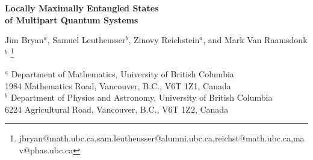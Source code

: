 \documentclass[12pt]{article}
\theoremstyle{definition}
\begin{document}
\tableofcontents
\begin{titlepage}
\hfill
\vbox{
    \halign{#\hfil         \cr
           } %
      }  %
\vspace*{20mm}
\begin{center}
{\Large \bf Locally Maximally Entangled States \\ of Multipart Quantum Systems}

\vspace*{15mm}
\vspace*{1mm}
Jim Bryan$^a$, Samuel Leutheusser$^b$, Zinovy Reichstein$^a$, and Mark Van Raamsdonk$^b$
\vspace*{1cm}
\let\thefootnote\relax\footnote{jbryan@math.ubc.ca,sam.leutheusser@alumni.ubc.ca,reichst@math.ubc.ca,mav@phas.ubc.ca}

{${}^{a}$ Department of Mathematics,
University of British Columbia\\
1984 Mathematics Road,
Vancouver, B.C., V6T 1Z1, Canada\\
${}^{b}$ Department of Physics and Astronomy,
University of British Columbia\\
6224 Agricultural Road,
Vancouver, B.C., V6T 1Z2, Canada}

\vspace*{1cm}
\end{center}
\begin{abstract}

For a multipart quantum system, a locally maximally entangled (LME) state is one where each elementary subsystem is maximally entangled with its complement, i.e. the reduced density matrix for each elementary subsystem is a multiple of the identity matrix. In this paper, we provide a complete answer for which multipart systems admit LME states by giving necessary and sufficient conditions on the subsystem dimensions $(d_1, d_2, \dots, d_n)$. When the space of such states is not empty, its quotient by local unitary transformations is a K\"ahler manifold that can be described as an algebraic variety in weighted projective space. We provide a general result for the dimension of this space, which is also equivalent to the full space of quantum states with ``generic'' entanglement up to SLOCC equivalence. We provide a general construction for a special class of ``stabilizer'' LME states based on the following observation: for any compact group $H$ (including finite groups) acting irreducibly on each subsystem, states invariant under $H$ up to a phase are LME. Finally, for a tripartite system with subsystems of dimensions $(2,A,B)$, we give an explicit construction of all LME states.
\end{abstract}

\end{titlepage}
\end{document}
